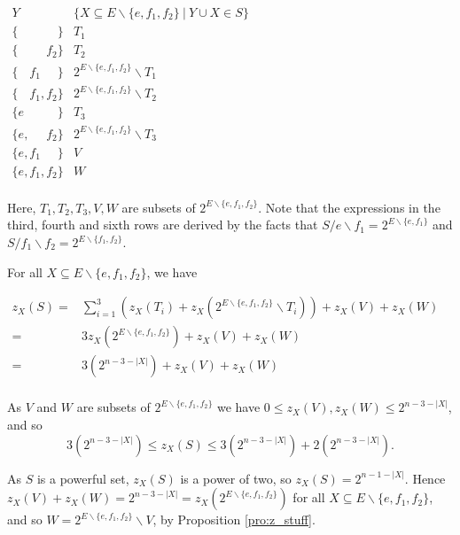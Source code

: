 \documentclass[10pt]{article}
\theoremstyle{definition}
\begin{document}
 \begin{center}	
  	$
 	\begin{array} {c|c}
 	    Y       &     \{X\subseteq E\backslash\{e,f_1,f_2\}\ |\ Y\cup X \in S\}    \\\hline
 	\{\phantom{e}\phantom{,}\phantom{f_1}\phantom{,}\phantom{f_2}\} & T_1	\\
 	\{\phantom{e,}\phantom{f_1,}{f_2}\} & T_2   \\
 	\{\phantom{e,}{f_1}\phantom{,}\phantom{f_2}\} & 2^{E\backslash\{e,f_1,f_2\}}\backslash T_1	\\	
 	\{\phantom{e,}{f_1,}{f_2}\}         & 2^{E\backslash\{e,f_1,f_2\}}\backslash T_2	\\	
 	\{{e}\phantom{,}\phantom{f_1}\phantom{,}\phantom{f_2}\}   & T_3	\\
 	\{{e}{,}\phantom{f_1}\phantom{,}{f_2}\}         & 2^{E\backslash\{e,f_1,f_2\}}\backslash T_3	\\
 	\{{e}{,}{f_1}\phantom{,}\phantom{f_2}\}           & V	\\
 	\{{e}{,}{f_1}{,}{f_2}\}                    & W	\\
 	\end{array}
 	$
 \end{center}

Here, $T_1,T_2,T_3,V,W$ are subsets of $2^{E\backslash\{e,f_1,f_2\}}$. Note that the expressions in the third, fourth and sixth rows are derived by the facts that $S/e\backslash f_1 =2^{E\backslash\{e,f_1\}}$ and $S/f_1\backslash f_2 =2^{E\backslash\{f_1,f_2\}}$.

 For all $X\subseteq E\backslash\{e,f_1,f_2\}$, we have
 \begin{center}
 	$
 	\begin{array} {rl}
 	z_X(S)	=	&	\sum_{i=1}^3 \left(z_X(T_i)+z_X(2^{E\backslash\{e,f_1,f_2\}}\backslash T_i) \right)+z_X(V)+z_X(W)\\
 	        =   &   3z_X(2^{E\backslash\{e,f_1,f_2\}})+z_X(V)+z_X(W)\\
        	=   &  3(2^{n-3-|X|})+z_X(V)+z_X(W)			\\
 	\end{array}
 	$
 \end{center}
 As $V$ and $W$ are subsets of $2^{E\backslash\{e,f_1,f_2\}}$ we have $0 \leq z_X(V),z_{X}(W) \leq 2^{n-3-|X|}$, and so
 \[ 3(2^{n-3-|X|}) \leq z_X(S)\leq  3(2^{n-3-|X|})+2(2^{n-3-|X|} ).\]
 
 
 As $S$ is a powerful set, $z_X(S)$ is a power of two, so $z_X(S)=2^{n-1-|X|}$. Hence $z_X(V)+z_{X}(W)=2^{n-3-|X|}=z_X(2^{E\backslash\{e,f_1,f_2\}})$ for all $X\subseteq E\backslash\{e,f_1,f_2\}$, and so $W=2^{E\backslash\{e,f_1,f_2\}}\backslash V$, by Proposition \ref{pro:z_stuff}.
 
\end{document}
